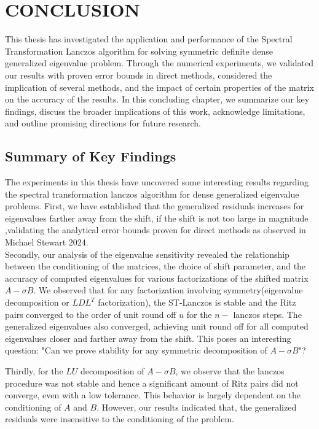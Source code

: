 \documentclass[12pt,gsu,online,openany,singleside,hidelinks]{gsudiss}
\begin{document}
\chapter{CONCLUSION}
This thesis has investigated the application and performance of the Spectral Transformation Lanczos algorithm for solving symmetric definite dense generalized eigenvalue problem. Through the numerical experiments, we validated our results with proven error bounds in direct methods, considered the implication of several methods, and the impact of certain properties of the matrix on the accuracy of the results. In this concluding chapter, we summarize our key findings, discuss the broader implications of this work, acknowledge limitations, and outline promising directions for future research.

\section{Summary of Key Findings}
The experiments in this thesis have uncovered some interesting results regarding the spectral transformation lanczos algorithm for dense generalized eigenvalue problems. First, we have established that the generalized residuals increases for eigenvalues farther away from the shift, if the shift is not too large in magnitude ,validating the analytical error bounds proven for direct methods as observed in Michael Stewart 2024.\\[10pt]
Secondly, our analysis of the eigenvalue sensitivity revealed the relationship between the conditioning of the matrices, the choice of shift parameter, and the accuracy of computed eigenvalues for various factorizations of the shifted matrix $A-\sigma B$. We observed that for any factorization involving symmetry(eigenvalue decomposition or $LDL^T$ factorization), the ST-Lanczos is stable and the Ritz pairs converged to the order of unit round off $u$ for the $n-$ lanczos steps. The generalized eigenvalues also converged, achieving unit round off for all computed eigenvalues closer and farther away from the shift. This poses an interesting question: "Can we prove stability for any symmetric decomposition of $A - \sigma B$"?

Thirdly, for the $LU$ decomposition of $A - \sigma B$, we observe that the lanczos procedure was not stable and hence a significant amount of Ritz pairs did not converge, even with a low tolerance. This behavior is largely dependent on the conditioning of $A$ and $B$. However, our results indicated that, the generalized residuals were insensitive to the conditioning of the problem.
\end{document}
